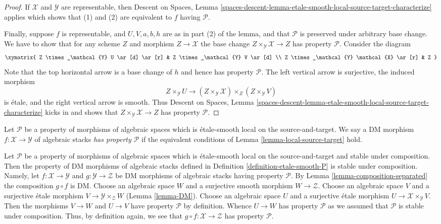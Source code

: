 \begin{proof}
\medskip\noindent
If $\mathcal{X}$ and $\mathcal{Y}$ are representable, then
Descent on Spaces,
Lemma \ref{spaces-descent-lemma-etale-smooth-local-source-target-characterize}
applies which shows that (1) and (2) are equivalent to $f$ having
$\mathcal{P}$.

\medskip\noindent
Finally, suppose $f$ is representable, and $U, V, a, b, h$ are
as in part (2) of the lemma, and that $\mathcal{P}$ is preserved under
arbitrary base change. We have to show that for any scheme
$Z$ and morphism $Z \to \mathcal{X}$ the base change
$Z \times_\mathcal{Y} \mathcal{X} \to Z$
has property $\mathcal{P}$. Consider the diagram
$$
\xymatrix{
Z \times_\mathcal{Y} U \ar[d] \ar[r] &
Z \times_\mathcal{Y} V \ar[d] \\
Z \times_\mathcal{Y} \mathcal{X} \ar[r] &
Z
}
$$
Note that the top horizontal arrow is a base change of $h$ and
hence has property $\mathcal{P}$. The left vertical arrow is
surjective, the induced morphism
$$
Z \times_\mathcal{Y} U \longrightarrow
(Z \times_\mathcal{Y} \mathcal{X}) \times_Z (Z \times_\mathcal{Y} V)
$$
is \'etale, and the right vertical arrow is smooth. Thus
Descent on Spaces,
Lemma \ref{spaces-descent-lemma-etale-smooth-local-source-target-characterize}
kicks in and shows that $Z \times_\mathcal{Y} \mathcal{X} \to Z$
has property $\mathcal{P}$.
\end{proof}

\begin{definition}
\label{definition-etale-smooth-P}
Let $\mathcal{P}$ be a property of morphisms of algebraic spaces
which is \'etale-smooth local on the source-and-target.
We say a DM morphism $f : \mathcal{X} \to \mathcal{Y}$ of algebraic stacks
{\it has property $\mathcal{P}$} if the equivalent conditions of
Lemma \ref{lemma-local-source-target}
hold.
\end{definition}

\begin{remark}
\label{remark-etale-smooth-composition}
Let $\mathcal{P}$ be a property of morphisms of algebraic spaces
which is \'etale-smooth local on the source-and-target and
stable under composition. Then the property of DM morphisms of algebraic stacks
defined in Definition \ref{definition-etale-smooth-P}
is stable under composition. Namely, let $f : \mathcal{X} \to \mathcal{Y}$
and $g : \mathcal{Y} \to \mathcal{Z}$ be DM morphisms of algebraic stacks
having property $\mathcal{P}$. By Lemma \ref{lemma-composition-separated}
the composition $g \circ f$ is DM. Choose an algebraic space $W$ and a
surjective smooth morphism $W \to \mathcal{Z}$. Choose an algebraic space
$V$ and a surjective \'etale morphism $V \to \mathcal{Y} \times_\mathcal{Z} W$
(Lemma \ref{lemma-DM}).
Choose an algebraic space $U$ and a surjective \'etale morphism
$U \to \mathcal{X} \times_\mathcal{Y} V$. Then the morphisms
$V \to W$ and $U \to V$ have property $\mathcal{P}$ by definition.
Whence $U \to W$ has property $\mathcal{P}$ as we assumed that
$\mathcal{P}$ is stable under composition. Thus, by definition again,
we see that $g \circ f : \mathcal{X} \to \mathcal{Z}$ has
property $\mathcal{P}$.
\end{remark}

